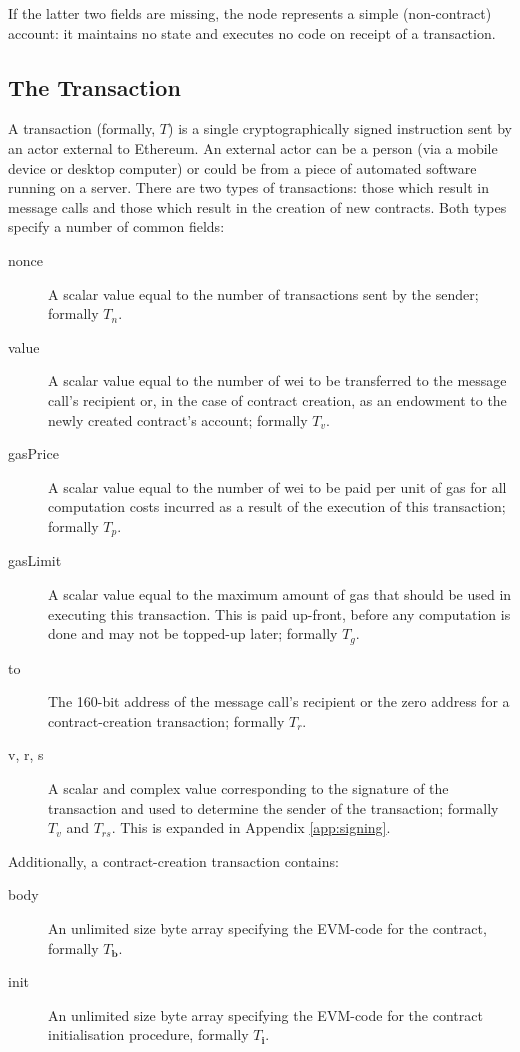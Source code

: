 \documentclass[9pt,oneside]{amsart}
\begin{document}
\begin{multicols}{2}
If the latter two fields are missing, the node represents a simple (non-contract) account: it maintains no state and executes no code on receipt of a transaction.

\subsection{The Transaction} \label{ch:transaction}

A transaction (formally, $T$) is a single cryptographically signed instruction sent by an actor external to Ethereum. An external actor can be a person (via a mobile device or desktop computer) or could be from a piece of automated software running on a server. There are two types of transactions: those which result in message calls and those which result in the creation of new contracts. Both types specify a number of common fields:

\begin{description}
\item[nonce] A scalar value equal to the number of transactions sent by the sender; formally $T_n$.
\item[value] A scalar value equal to the number of wei to be transferred to the message call's recipient or, in the case of contract creation, as an endowment to the newly created contract's account; formally $T_v$.
\item[gasPrice] A scalar value equal to the number of wei to be paid per unit of gas for all computation costs incurred as a result of the execution of this transaction; formally $T_p$.
\item[gasLimit] A scalar value equal to the maximum amount of gas that should be used in executing this transaction. This is paid up-front, before any computation is done and may not be topped-up later; formally $T_g$.
\item[to] The 160-bit address of the message call's recipient or the zero address for a contract-creation transaction; formally $T_r$.
\item[v, r, s] A scalar and complex value corresponding to the signature of the transaction and used to determine the sender of the transaction; formally $T_v$ and $T_{rs}$. This is expanded in Appendix \ref{app:signing}.
\end{description}

Additionally, a contract-creation transaction contains:

\begin{description}
\item[body] An unlimited size byte array specifying the EVM-code for the contract, formally $T_\mathbf{b}$.
\item[init] An unlimited size byte array specifying the EVM-code for the contract initialisation procedure, formally $T_\mathbf{i}$.
\end{description}


\end{multicols}
\end{document}
